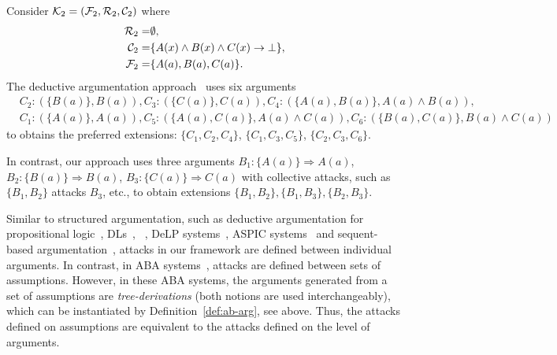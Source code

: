 
\begin{example}
Consider $\mathcal{K}_2 = ( \mathcal{F}_2, \mathcal{R}_2, \mathcal{C}_2)$ where
\begin{align*}
	\mathcal{R}_2  = & \emptyset,\\
	\mathcal{C}_2  = & \{ A(x) \land B(x) \land C(x) \rightarrow \bot \}, \\
    \mathcal{F}_2 =  &\{A(a), B(a), C(a) \}.
   \end{align*} 
%
The deductive argumentation approach~\cite{ARIOUA201776} uses six arguments
%
\begin{align*}
& C_2: ( \{B(a) \}, B(a)), C_3: (\{ C(a) \}, C(a) ), C_4: ( \{A(a), B(a) \}, A(a) \land B(a) ), \\
& C_1: ( \{A(a)\}, A(a)), C_5: ( \{ A(a), C(a) \}, A(a) \land C(a)), C_6: ( \{B(a), C(a) \}, B(a) \land C(a))    
\end{align*}
%
to obtains the preferred extensions: $\{C_1, C_2, C_4\}$,
$\{C_1, C_3, C_5\}$, $\{C_2, C_3, C_6\}$.

In contrast, our approach uses three arguments $B_1 : \{ A(a)\} \Rightarrow A(a)$, $B_2 : \{ B(a)\} \Rightarrow B(a)$, $B_3 : \{ C(a)\} \Rightarrow C(a)$  with collective attacks, such as $\{B_1, B_2 \}$ attacks $B_3$, etc., to obtain extensions $\{B_1, B_2\}, \{B_1, B_3\}, \{B_2, B_3\}$.


\end{example}

\begin{remark}
\label{re:compare-attacks}
Similar to structured argumentation, such as deductive argumentation for propositional logic~\cite{BesnardH01}, DLs~\cite{ZhangL13}, \datalogPM~\cite{ARIOUA201776},
DeLP systems~\cite{Alejandro2014},  ASPIC systems~\cite{Prakken2002}
and sequent-based argumentation~\cite{HEYNINCK2020103,ArieliH24}, attacks in our framework are defined between individual arguments.
In contrast, in ABA systems~\cite{Dung2009,DimopoulosD0R0W24,Rapberger2024,Lehtonen2024}, attacks are defined between sets of assumptions.
However, in these ABA systems, the arguments generated from a set of assumptions are \emph{tree-derivations} (both notions are used interchangeably), which can be instantiated by Definition~\ref{def:ab-arg}, see above.
Thus, the attacks defined on assumptions are equivalent to the attacks defined on the level of arguments.
\end{remark}


